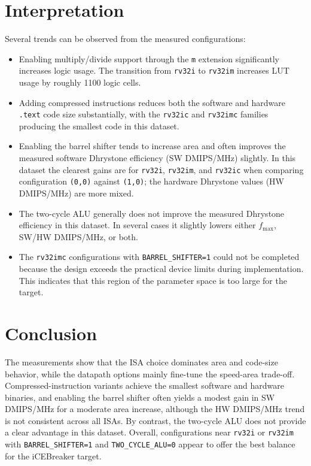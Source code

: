 \documentclass[a4paper,11pt]{article}
\begin{document}
\section*{Interpretation}
Several trends can be observed from the measured configurations:

\begin{itemize}
	\item Enabling multiply/divide support through the \texttt{m} extension significantly increases logic usage. The transition from \texttt{rv32i} to \texttt{rv32im} increases LUT usage by roughly 1100 logic cells.
	\item Adding compressed instructions reduces both the software and hardware \texttt{.text} code size substantially, with the \texttt{rv32ic} and \texttt{rv32imc} families producing the smallest code in this dataset.
	\item Enabling the barrel shifter tends to increase area and often improves the measured software Dhrystone efficiency (SW DMIPS/MHz) slightly. In this dataset the clearest gains are for \texttt{rv32i}, \texttt{rv32im}, and \texttt{rv32ic} when comparing configuration \texttt{(0,0)} against \texttt{(1,0)}; the hardware Dhrystone values (HW DMIPS/MHz) are more mixed.
	\item The two-cycle ALU generally does not improve the measured Dhrystone efficiency in this dataset. In several cases it slightly lowers either $f_{\max}$, SW/HW DMIPS/MHz, or both.
	\item The \texttt{rv32imc} configurations with \texttt{BARREL\_SHIFTER=1} could not be completed because the design exceeds the practical device limits during implementation. This indicates that this region of the parameter space is too large for the target.
\end{itemize}

\section*{Conclusion}
The measurements show that the ISA choice dominates area and code-size behavior, while the datapath options mainly fine-tune the speed-area trade-off. Compressed-instruction variants achieve the smallest software and hardware binaries, and enabling the barrel shifter often yields a modest gain in SW DMIPS/MHz for a moderate area increase, although the HW DMIPS/MHz trend is not consistent across all ISAs. By contrast, the two-cycle ALU does not provide a clear advantage in this dataset. Overall, configurations near \texttt{rv32i} or \texttt{rv32im} with \texttt{BARREL\_SHIFTER=1} and \texttt{TWO\_CYCLE\_ALU=0} appear to offer the best balance for the iCEBreaker target.
\end{document}
